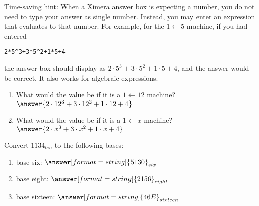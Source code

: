 \documentclass[nooutcomes]{ximera}
\begin{document}
\begin{problem}
\begin{problem}
Time-saving hint:  When a Ximera answer box is expecting a number, you do not need to type your answer as single number.  Instead, you may enter an expression that evaluates to that number.  
For example, for the $1\leftarrow 5$ machine, if you had entered 
\begin{verbatim}
2*5^3+3*5^2+1*5+4
\end{verbatim}
the answer box should display as $2\cdot 5^3+3\cdot 5^2+1\cdot 5+4$, and the answer would be correct.  It also works for algebraic expressions.  
\begin{enumerate}
\item What would the value be if it is a $1\leftarrow 12$ machine? $\answer{2\cdot 12^3+3\cdot 12^2+1\cdot 12+4}$
\item What would the value be if it is a $1\leftarrow x$ machine? $\answer{2\cdot x^3+3\cdot x^2+1\cdot x+4}$
\end{enumerate}
\end{problem}

\end{problem}

\begin{problem}
Convert $1134_{ten}$ to the following bases: 
\begin{enumerate}
\item base six: $\answer[format=string]{5130}_{six}$
\item base eight: $\answer[format=string]{2156}_{eight}$
\item base sixteen: $\answer[format=string]{46E}_{sixteen}$
\end{enumerate}
\end{problem}
\end{document}
